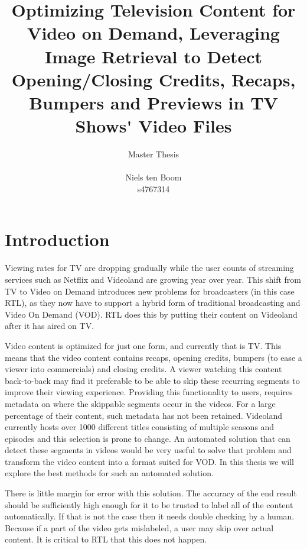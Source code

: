 \documentclass{article}
\begin{document}
\title{Optimizing Television Content for Video on Demand, Leveraging Image Retrieval to Detect Opening/Closing Credits, Recaps, Bumpers and Previews in TV Shows\'{} Video Files}
\author{Master Thesis\\ \\ Niels ten Boom  \\ s4767314}

\date{\vspace{-3ex}}

\maketitle
\newpage

\tableofcontents
\newpage

\section{Introduction} \label{introduction}
Viewing rates for TV are dropping gradually while the user counts of streaming services such as Netflix and Videoland are growing year over year. This shift from TV to Video on Demand introduces new problems for broadcasters (in this case RTL), as they now have to support a hybrid form of traditional broadcasting and Video On Demand (VOD). RTL does this by putting their content on Videoland after it has aired on TV. 

Video content is optimized for just one form, and currently that is TV. This means that the video content contains recaps, opening credits, bumpers (to ease a viewer into commercials) and closing credits. A viewer watching this content back-to-back may find it preferable to be able to skip these recurring segments to improve their viewing experience. Providing this functionality to users, requires metadata on where the skippable segments occur in the videos. For a large percentage of their content, such metadata has not been retained. Videoland currently hosts over 1000 different titles consisting of multiple seasons and episodes and this selection is prone to change. An automated solution that can detect these segments in videos would be very useful to solve that problem and transform the video content into a format suited for VOD. In this thesis we will explore the best methods for such an automated solution. 

There is little margin for error with this solution. The accuracy of the end result should be sufficiently high enough for it to be trusted to label all of the content automatically. If that is not the case then it needs double checking by a human. Because if a part of the video gets mislabeled, a user may skip over actual content. It is critical to RTL that this does not happen.
\end{document}
